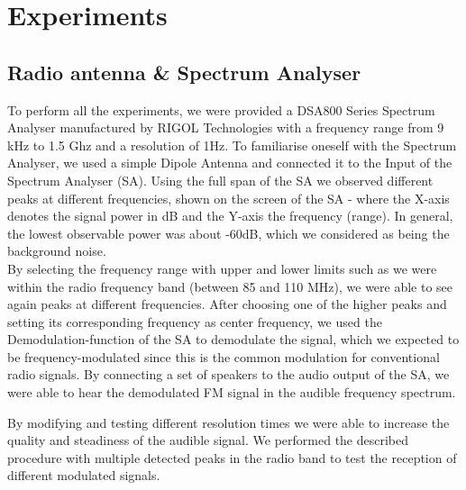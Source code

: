 

\section{Experiments}

\subsection{Radio antenna \& Spectrum Analyser}
To perform all the experiments, we were provided a DSA800 Series Spectrum Analyser manufactured by RIGOL Technologies with a frequency range from 9 kHz to 1.5 Ghz and a resolution of 1Hz. 
To familiarise oneself with the Spectrum Analyser, we used a simple Dipole Antenna and connected it to the Input of the Spectrum Analyser (SA). Using the full span of the SA we observed different peaks at different frequencies, shown on the screen of the SA - where the X-axis denotes the signal power in dB and the Y-axis the frequency (range). In general, the lowest observable power was about -60dB, which we considered as being the background noise.\\
By selecting the frequency range with upper and lower limits such as we were within the radio frequency band (between 85 and 110 MHz), we were able to see again peaks at different frequencies. After choosing one of the higher peaks and setting its corresponding frequency as center frequency, we used the Demodulation-function of the SA to demodulate the signal, which we expected to be frequency-modulated since this is the common modulation for conventional radio signals. By connecting a set of speakers to the audio output of the SA, we were able to hear the demodulated FM signal in the audible frequency spectrum.

By modifying and testing different resolution times we were able to increase the quality and steadiness of the audible signal. We performed the described procedure with multiple detected peaks in the radio band to test the reception of different modulated signals.




